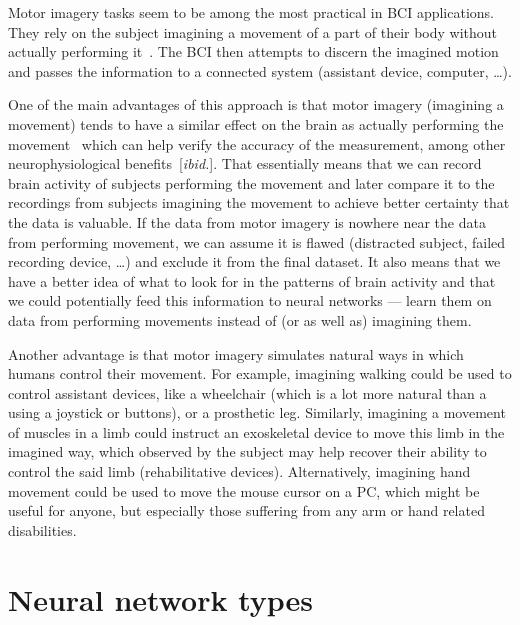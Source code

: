 \documentclass[eng,BP]{thesiskiv}
\begin{document}
Motor imagery tasks seem to be among the most practical in BCI applications. 
They rely on the subject imagining a movement of a part of their body without actually performing it~\cite{craik:dl:eeg:rev:19}.
The BCI then attempts to discern the imagined motion and passes the information to a connected system (assistant device, computer, \dots).

One of the main advantages of this approach is that motor imagery (imagining a movement) tends to have a similar effect on the brain as actually performing the movement~\cite{pfurtscheller:mi:01} which can help verify the accuracy of the measurement, among other neurophysiological benefits~[\emph{ibid.}].
That essentially means that we can record brain activity of subjects performing the movement and later compare it to the recordings from subjects imagining the movement to achieve better certainty that the data is valuable. If the data from motor imagery is nowhere near the data from performing movement, we can assume it is flawed (distracted subject, failed recording device, \dots) and exclude it from the final dataset.
It also means that we have a better idea of what to look for in the patterns of brain activity and that we could potentially feed this information to neural networks --- learn them on data from performing movements instead of (or as well as) imagining them.

Another advantage is that motor imagery simulates natural ways in which humans control their movement.	For example, imagining walking could be used to control assistant devices, like a wheelchair (which is a lot more natural than a using a joystick or buttons), or a prosthetic leg. Similarly, imagining a movement of muscles in a limb could instruct an exoskeletal device to move this limb in the imagined way, which observed by the subject may help recover their ability to control the said limb (rehabilitative devices). Alternatively, imagining hand movement could be used to move the mouse cursor on a PC, which might be useful for anyone, but especially those suffering from any arm or hand related disabilities.


\section{Neural network types}

\end{document}
